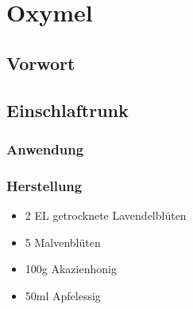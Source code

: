 \chapter{Oxymel}

\section{Vorwort}


\lipsum[1-5]

\cite{nedoma2019das}

\newpage



\section{Einschlaftrunk}


\cite{nedoma2018heiltinkturen}

\subsection{Anwendung}
\subsection{Herstellung}
\begin{itemize}
	\item 2 EL getrocknete Lavendelblüten
	\item 5 Malvenblüten
	\item 100g Akazienhonig
	\item 50ml Apfelessig
\end{itemize}




\newpage